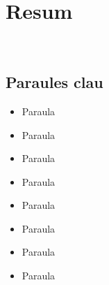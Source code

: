 \chapter*{Resum}\label{ch:abstract-ca}

\lipsum[1-2] \\

\section*{Paraules clau}\label{sec:keywords-ca}
\begin{multicols}{2}
    \begin{itemize}
        \item Paraula
        \item Paraula
        \item Paraula
        \item Paraula
    \end{itemize}
    \columnbreak
    \begin{itemize}
        \item Paraula
        \item Paraula
        \item Paraula
        \item Paraula
    \end{itemize}
\end{multicols}
